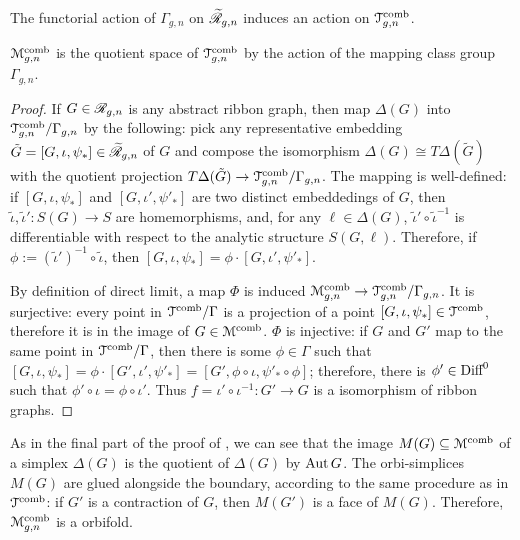 The functorial action of $\Gamma_{g,n}$ on $\mathscr{\widetilde R}_{g,n}$ induces an action
on $\mathcal{T}\sp{\text{comb}}_{g,n}$.
\begin{lemma}
  \label{lemma:penner-kontsevich-bridge}
  $\mathcal{M}\sp{\text{comb}}_{g,n}$ is the quotient space of $\mathcal{T}\sp{\text{comb}}_{g,n}$ by the action
  of the mapping class group $\Gamma_{g,n}$.%
\end{lemma}
\begin{proof}
  If $G \in \mathscr{R}_{g,n}$ is any abstract ribbon graph, then map $\Delta(G)$ into
  $\mathcal{T}\sp{\text{comb}}_{g,n} / \Gamma_{g,n}$ by the following: pick any representative
  embedding ${\tilde G} = [G, \iota, \psi_*] \in \mathscr{\widetilde R}_{g,n}$ of $G$ and compose
  the isomorphism $\Delta(G) \cong T\Delta(\tilde G)$ with the quotient projection
  $T\Delta(\tilde G) \to \mathcal{T}\sp{\text{comb}}_{g,n}/\Gamma_{g,n}$.  The mapping is well-defined:
  if $[G, \iota, \psi_*]$ and $[G, \iota', \psi'_*]$ are two distinct embeddedings
  of $G$, then ${\tilde \iota}, {\tilde \iota'}: S(G) \to S$ are homemorphisms,
  and, for any $\ell \in \Delta(G)$, ${\tilde \iota'} \circ {\tilde \iota}^{-1}$ is
  differentiable with respect to the analytic structure $S(G, \ell)$.
  Therefore, if $\phi := ({\tilde \iota}')^{-1} \circ {\tilde \iota}$, then $[G, \iota,
  \psi_*] = \phi \cdot [G, \iota', \psi'_*]$.

  By definition of direct limit, a map $\Phi$ is induced $\mathcal{M}\sp{\text{comb}}_{g,n} \to
  \mathcal{T}\sp{\text{comb}}_{g,n} / \Gamma_{g,n}$.  It is surjective: every point in $\mathcal{T}\sp{\text{comb}} /
  \Gamma$ is a projection of a point $[G, \iota, \psi_*] \in \mathcal{T}\sp{\text{comb}}$, therefore it
  is in the image of $G \in \mathcal{M}\sp{\text{comb}}$.  $\Phi$ is injective: if $G$ and $G'$
  map to the same point in $\mathcal{T}\sp{\text{comb}} / \Gamma$, then there is some $\phi \in \Gamma$
  such that $[G, \iota, \psi_*] = \phi \cdot [G', \iota', \psi'_*] = [G', \phi \circ \iota, \psi'_* \circ
  \phi]$; therefore, there is $\phi' \in \textrm{Diff}^0$ such that $\phi' \circ \iota = \phi \circ \iota'$.
  Thus $f = \iota' \circ \iota^{-1}: G' \to G$ is a isomorphism of ribbon
  graphs.
\end{proof}

As in the final part of the proof of
, we can see that the image
$M(G) \subseteq \mathcal{M}\sp{\text{comb}}$ of a simplex $\Delta(G)$ is the quotient of $\Delta(G)$ by $\operatorname{Aut}
G$.  The orbi-simplices $M(G)$ are glued alongside the boundary,
according to the same procedure as in $\mathcal{T}\sp{\text{comb}}$: if $G'$ is a
contraction of $G$, then $M(G')$ is a face of $M(G)$. Therefore,
$\mathcal{M}\sp{\text{comb}}_{g,n}$ is a orbifold.

